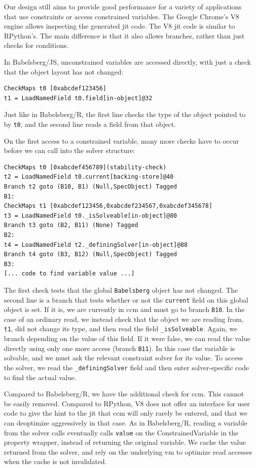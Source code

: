 Our design still aims to provide good performance for a variety of applications
that use constraints or access constrained variables. The Google Chrome's V8
engine allows inspecting the generated \ac{jit} code. The V8 \ac{jit} code is
similar to RPython's. The main difference is that it also allows branches,
rather than just checks for conditions.

In Babelsberg/JS, unconstrained variables are accessed directly, with just a
check that the object layout has not changed:
\begin{lstlisting}[language=v8hydra]
CheckMaps t0 [0xabcdef123456]  
t1 = LoadNamedField t0.field[in-object]@32  
\end{lstlisting}
Just like in Babelsberg/R, the first line checks the type of the object pointed
to by \verb!t0!, and the second line reads a field from that object.

On the first access to a constrained variable, many more checks have to occur
before we can call into the solver structure:
\begin{lstlisting}[language=v8hydra]
CheckMaps t0 [0xabcdef456789](stability-check)
t2 = LoadNamedField t0.current[backing-store]@40
Branch t2 goto (B10, B1) (Null,SpecObject) Tagged
B1:
CheckMaps t1 [0xabcdef123456,0xabcdef234567,0xabcdef345678]
t3 = LoadNamedField t0._isSolveable[in-object]@80
Branch t3 goto (B2, B11) (None) Tagged
B2:
t4 = LoadNamedField t2._definingSolver[in-object]@88
Branch t4 goto (B3, B12) (Null,SpecObject) Tagged  
B3:
[... code to find variable value ...]
\end{lstlisting}
The first check tests that the global \verb!Babelsberg! object has not
changed. The second line is a branch that tests whether or not the \verb!current!
field on this global object is set. If it is, we are currently in \acrlong{ccm}
and must go to branch \verb!B10!. In the case of an ordinary read, we instead
check that the object we are reading from, \verb!t1!, did not change its type,
and then read the field \verb!_isSolveable!. Again, we branch depending on the
value of this field. If it were false, we can read the value directly using only
one more access (branch \verb!B11!). In this case the variable is solvable, and
we must ask the relevant constraint solver for its value. To access the solver,
we read the \verb!_definingSolver! field and then enter solver-specific code to
find the actual value.

Compared to Babelsberg/R, we have the additional check for \ac{ccm}. This cannot
be easily removed. Compared to RPython, V8 does not offer an interface for user
code to give the hint to the \ac{jit} that \ac{ccm} will only rarely be entered,
and that we can deoptimize aggressively in that case. As in Babelsberg/R,
reading a variable from the solver calls eventually calls \verb!value! on the
ConstrainedVariable in the property wrapper, instead of returning the original
variable. We cache the value returned from the solver, and rely on the
underlying \ac{vm} to optimize read accesses when the cache is not invalidated.

